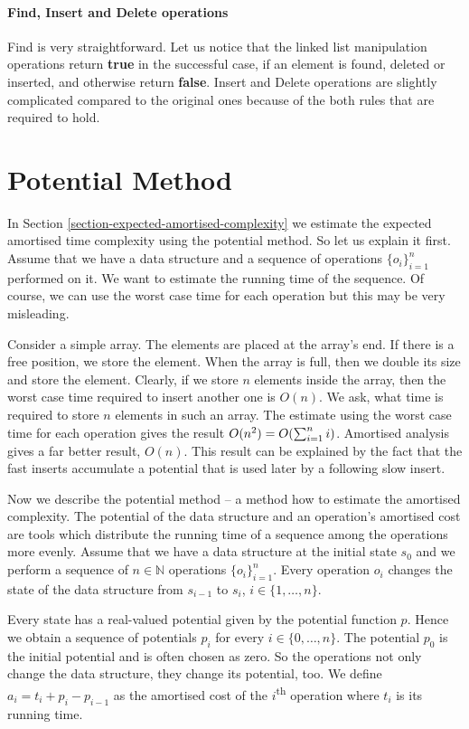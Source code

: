 \paragraph*{Find, Insert and Delete operations}
Find is very straightforward. Let us notice that the linked list manipulation operations return \textbf{true} in the successful case, if an element is found, deleted or inserted, and otherwise return \textbf{false}. Insert and Delete operations are slightly complicated compared to the original ones because of the both rules that are required to hold.

\section{Potential Method} 
In Section \ref{section-expected-amortised-complexity} we estimate the expected amortised time complexity using the potential method. So let us explain it first. Assume that we have a data structure and a sequence of operations $\{o_i\}_{i = 1}^{n}$ performed on it. We want to estimate the running time of the sequence. Of course, we can use the worst case time for each operation but this may be very misleading. 

Consider a simple array. The elements are placed at the array's end. If there is a free position, we store the element. When the array is full, then we double its size and store the element. Clearly, if we store $n$ elements inside the array, then the worst case time required to insert another one is $O(n)$. We ask, what time is required to store $n$ elements in such an array. The estimate using the worst case time for each operation gives the result $O(n ^ 2) =O(\sum\displaylimits_{i = 1}^{n} i)$. Amortised analysis gives a far better result, $O(n)$. This result can be explained by the fact that the fast inserts accumulate a potential that is used later by a following slow insert.

Now we describe the potential method -- a method how to estimate the amortised complexity. The potential of the data structure and an operation's amortised cost are tools which distribute the running time of a sequence among the operations more evenly. Assume that we have a data structure at the initial state $s_0$ and we perform a sequence of $n \in \mathbb{N}$ operations $\{o_i\}_{i = 1}^{n}$. Every operation $o_i$ changes the state of the data structure from $s_{i - 1}$ to $s_i$, $i \in \{1, \dots, n\}$. 

Every state has a real-valued potential given by the potential function $p$. Hence we obtain a sequence of potentials $p_i$ for every $i \in \{0, \dots, n\}$. The potential $p_0$ is the initial potential and is often chosen as zero. So the operations not only change the data structure, they change its potential, too. We define $a_i = t_i + p_{i} - p_{i - 1}$ as the amortised cost of the $i$\textsuperscript{th} operation where $t_i$ is its running time. 

